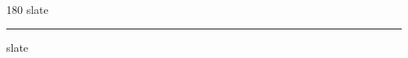 
\begin{frame}
\begin{center}
\begin{turn}{180}
{\fontsize{2.5cm}{1em}\selectfont slate}
\end{turn}
\vspace{1em}\par  
\hrule
\vspace{1em}\par  
{\fontsize{2.5cm}{1em}\selectfont slate}
\end{center}
\end{frame}
